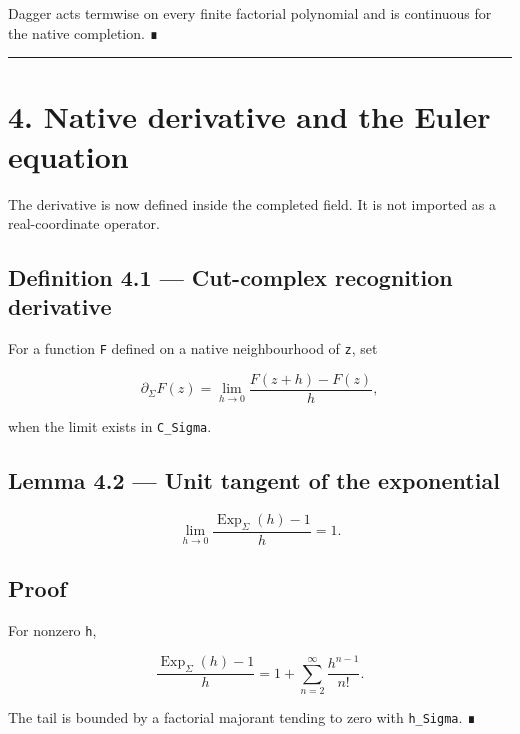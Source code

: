 Dagger acts termwise on every finite factorial polynomial and is continuous for
the native completion. ∎

\begin{center}\rule{0.5\linewidth}{0.5pt}\end{center}

\hypertarget{native-derivative-and-the-euler-equation}{%
\section{4. Native derivative and the Euler equation}\label{native-derivative-and-the-euler-equation}}

The derivative is now defined inside the completed field. It is not imported as
a real-coordinate operator.

\hypertarget{definition-4.1-cut-complex-recognition-derivative}{%
\subsection{Definition 4.1 --- Cut-complex recognition derivative}\label{definition-4.1-cut-complex-recognition-derivative}}

For a function \texttt{F} defined on a native neighbourhood of \texttt{z}, set

\[
\partial_\Sigma F(z)
=
\lim_{h\to0}
\frac{F(z+h)-F(z)}{h},
\]

when the limit exists in \texttt{C\_Sigma}.

\hypertarget{lemma-4.2-unit-tangent-of-the-exponential}{%
\subsection{Lemma 4.2 --- Unit tangent of the exponential}\label{lemma-4.2-unit-tangent-of-the-exponential}}

\[
\lim_{h\to0}
\frac{\operatorname{Exp}_\Sigma(h)-1}{h}
=1.
\]

\hypertarget{proof-3}{%
\subsection{Proof}\label{proof-3}}

For nonzero \texttt{h},

\[
\frac{\operatorname{Exp}_\Sigma(h)-1}{h}
=
1+
\sum_{n=2}^{\infty}\frac{h^{n-1}}{n!}.
\]

The tail is bounded by a factorial majorant tending to zero with \texttt{\textbar{}h\textbar{}\_Sigma}.
∎

